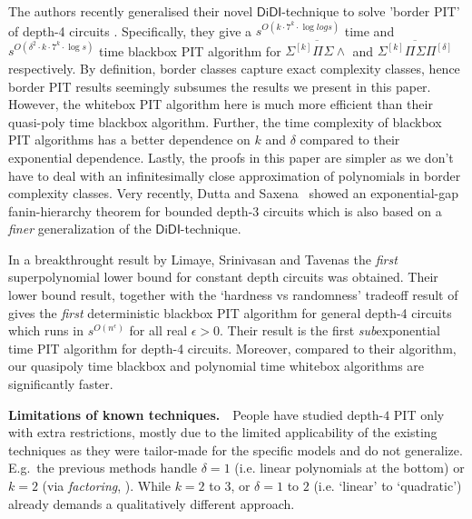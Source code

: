 \documentclass[10pt,a4paper]{article}
\newcommand{\DiDI}{\mathsf{DiDI}}
\newcommand{\SPSP}[3]{\Sigma^{#1}\Pi^{#2}\Sigma\Pi^{#3}}
\newcommand{\SPSU}[3]{\Sigma^{#1} \Pi^{#2} \Sigma \wedge^{#3}}
\numberwithin{equation}{section}
\begin{document}
The authors recently generalised their novel $\DiDI$-technique to solve 'border PIT' of depth-4 circuits \cite{DDS21}. Specifically, they give a $s^{O(k \cdot 7^k \cdot \log log s)}$ time and $s^{O(\delta^2 \cdot k \cdot 7^k \cdot \log s)}$ time blackbox PIT algorithm for $\overline{\SPSU{[k]}{}{}}$ and $\overline{\SPSP{[k]}{}{[\delta]}}$ respectively. By definition, border classes capture exact complexity classes, hence border PIT results seemingly subsumes the results we present in this paper. However, the whitebox PIT algorithm here is much more efficient than their quasi-poly time blackbox algorithm. Further, the time complexity of blackbox PIT algorithms has a better dependence on $k$ and $\delta$ compared to their exponential dependence. Lastly, the proofs in this paper are simpler as we don't have to deal with an infinitesimally close approximation of polynomials in  border complexity classes. Very recently, Dutta and Saxena~\cite{duttaseparated21} showed an exponential-gap fanin-hierarchy theorem for bounded depth-3 circuits which is also based on a {\em finer} generalization of the $\DiDI$-technique.

In a breakthrought result by Limaye, Srinivasan and Tavenas \cite{LST21} the {\em first} superpolynomial lower bound for constant depth circuits was obtained. Their lower bound result, together with the `hardness vs randomness' tradeoff result of \cite{chou2018hardness} gives the {\em first} deterministic blackbox PIT algorithm for general depth-4 circuits which runs in $s^{O(n^\epsilon)}$ for all real $\epsilon > 0$. Their result is the first {\em sub}exponential time PIT algorithm for depth-4 circuits. Moreover, compared to their algorithm, our quasipoly time blackbox and polynomial time whitebox algorithms are significantly faster.

%
\medskip
{\bf Limitations of known techniques.}~~People have studied depth-$4$ PIT only with extra restrictions, mostly due to the limited applicability of the existing techniques as they were tailor-made for the specific models and do not generalize. E.g.~the previous methods handle  $\delta=1$ (i.e. linear polynomials at the bottom) or $k=2$ (via \emph{factoring}, \cite{saha2013case}). While $k=2$ to $3$, or $\delta=1$ to $2$ (i.e. `linear' to `quadratic') already demands a qualitatively different approach.  
\end{document}
